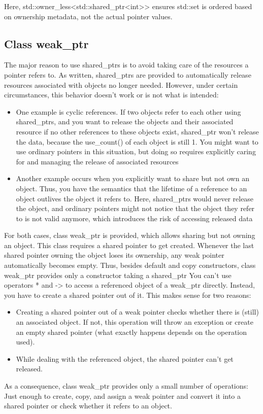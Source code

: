 \documentclass{report}
\begin{document}
\bigbreak \noindent 
 Here, std::owner\_less<std::shared\_ptr<int>> ensures std::set is ordered based on ownership metadata, not the actual pointer values.








\bigbreak \noindent 
\subsection{Class weak\_ptr}
\bigbreak \noindent 
The major reason to use shared\_ptrs is to avoid taking care of the resources a pointer refers to. As written, shared\_ptrs are provided to automatically release resources associated with objects no longer needed.
\bigbreak \noindent 
However, under certain circumstances, this behavior doesn’t work or is not what is intended:
\begin{itemize}
    \item One example is cyclic references. If two objects refer to each other using shared\_ptrs, and you want to release the objects and their associated resource if no other references to these objects exist, shared\_ptr won’t release the data, because the use\_count() of each object is still 1. You might want to use ordinary pointers in this situation, but doing so requires explicitly caring for and managing the release of associated resources
    \item Another example occurs when you explicitly want to share but not own an object. Thus, you have the semantics that the lifetime of a reference to an object outlives the object it refers to. Here, shared\_ptrs would never release the object, and ordinary pointers might not notice that the object they refer to is not valid anymore, which introduces the risk of accessing released data
\end{itemize}
\bigbreak \noindent 
For both cases, class weak\_ptr is provided, which allows sharing but not owning an object. This
class requires a shared pointer to get created. Whenever the last shared pointer owning the object
loses its ownership, any weak pointer automatically becomes empty. Thus, besides default and copy
constructors, class weak\_ptr provides only a constructor taking a shared\_ptr
\bigbreak \noindent 
You can’t use operators * and -> to access a referenced object of a weak\_ptr directly. Instead, you have to create a shared pointer out of it. This makes sense for two reasons:
\begin{itemize}
    \item Creating a shared pointer out of a weak pointer checks whether there is (still) an associated object. If not, this operation will throw an exception or create an empty shared pointer (what exactly happens depends on the operation used).
    \item While dealing with the referenced object, the shared pointer can’t get released.
\end{itemize}
As a consequence, class weak\_ptr provides only a small number of operations: Just enough to create, copy, and assign a weak pointer and convert it into a shared pointer or check whether it refers to an object.
\bigbreak \noindent 
\end{document}
